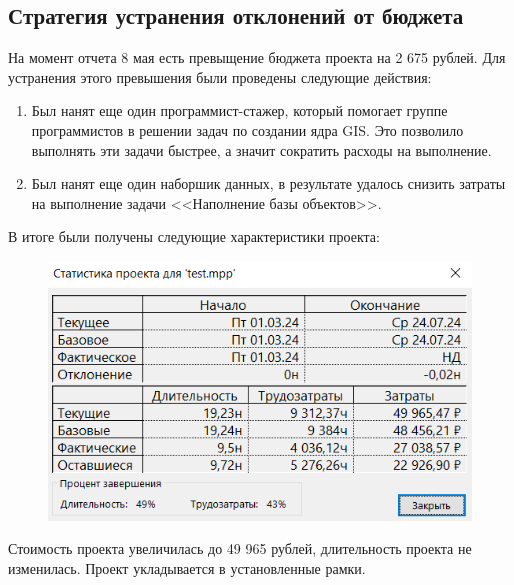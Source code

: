 \subsection*{Стратегия устранения отклонений от бюджета}

На момент отчета 8 мая есть превыщение бюджета проекта на 2 675 рублей. Для устранения этого превышения были проведены следующие действия:

\begin{enumerate}
    \item Был нанят еще один программист-стажер, который помогает группе программистов в решении задач по создании ядра GIS. Это позволило выполнять эти задачи быстрее, а значит сократить расходы на выполнение.
    \item Был нанят еще один наборшик данных, в результате удалось снизить затраты на выполнение задачи <<Наполнение базы объектов>>.
\end{enumerate}

В итоге были получены следующие характеристики проекта:

\begin{figure}[h!]
	\begin{center}
		\includegraphics[scale=0.7]{inc/img/p_29.png}
	\end{center}
	\captionsetup{justification=centering}
	\label{fig:u3}
\end{figure}

Стоимость проекта увеличилась до 49 965 рублей, длительность проекта не изменилась. Проект укладывается в установленные рамки.
